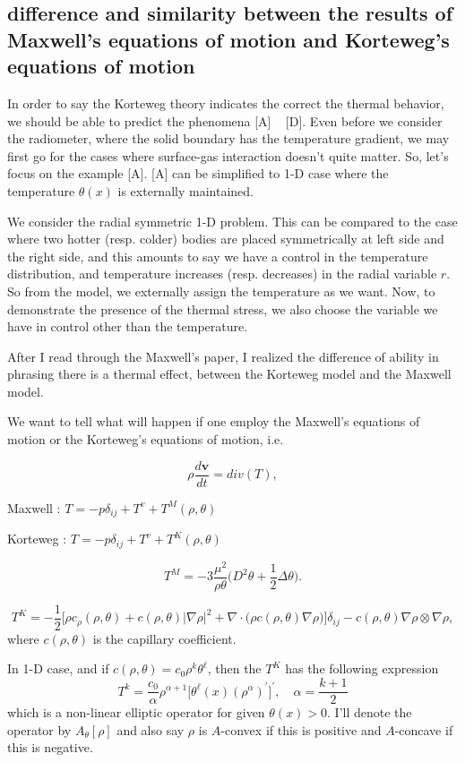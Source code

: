 \documentclass[a4paper,12pt]{article}
\begin{document}
\subsection{difference and similarity between the results of Maxwell's equations of motion and Korteweg's equations of motion}
In order to say the Korteweg theory indicates the correct the thermal behavior, we should be able to predict the phenomena [A] ~ [D]. Even before we consider the radiometer, where the solid boundary has the temperature gradient, we may first go for the cases where surface-gas interaction doesn't quite matter. So, let's focus on the example [A]. [A] can be simplified to 1-D case where the temperature $\theta(x)$ is externally maintained.


We consider the radial symmetric 1-D problem. This can be compared to the case where two hotter (resp. colder) bodies are placed symmetrically at left side and the right side, and this amounts to say we have a control in the temperature distribution, and temperature increases (resp. decreases) in the radial variable $r$. So from the model, we externally assign the temperature as we want. Now, to demonstrate the presence of the thermal stress, we also choose the variable we have in control other than the temperature.

After I read through the Maxwell's paper, I realized the difference of ability in phrasing there is a thermal effect, between the Korteweg model and the Maxwell model.

We want to tell what will happen if one employ the Maxwell's equations of motion or the Korteweg's equations of motion, i.e.

$$ \rho \frac{d\mathbf{v}}{dt} = div(T),$$

Maxwell : {{{ $T = -p \delta_{ij} + T^v + T^M(\rho,\theta)$ }}}

Korteweg : {{{ $T= -p \delta_{ij} + T^v + T^K(\rho,\theta)$ }}}

{{{$$T^M = -3\frac{\mu^2}{\rho\theta} \big( D^2 \theta + \frac{1}{2}\Delta \theta\big).$$}}}

{{{$$ T^K = -\frac{1}{2} \Big[ \rho c_\rho (\rho,\theta) + c(\rho,\theta) |\nabla \rho|^2 + \nabla \cdot \big(\rho c(\rho,\theta) \nabla \rho\big) \Big] \delta_{ij} - c(\rho,\theta) \nabla \rho \otimes \nabla\rho,$$}}} where $c(\rho,\theta)$ is the capillary coefficient.

In 1-D case, and if {{{ $c(\rho,\theta) = c_0 \rho^k \theta^\ell$}}}, then the {{{$T^K$}}} has the following expression {{{ $$ T^k = \frac{c_0}{\alpha} \rho^{\alpha+1} \Big[ \theta^{\ell}(x) (\rho^{\alpha})^\prime \Big]^\prime, \quad \alpha = \frac{k+1}{2} $$}}} which is a non-linear elliptic operator for given $\theta(x)>0$. I'll denote the operator by {{{$ A_\theta[\rho]$}}} and also say $\rho$ is $A$-convex if this is positive and $A$-concave if this is negative.
\end{document}
